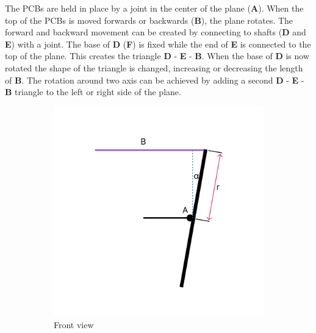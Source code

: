 \newpage\noindent
The PCBs are held in place by a joint in the center of the plane (\textbf{A}). When the top of the PCBs is moved forwards or backwards (\textbf{B}), the plane rotates. The forward and backward movement can be created by connecting to shafts (\textbf{D} and \textbf{E}) with a joint. The base of \textbf{D} (\textbf{F}) is fixed while the end of \textbf{E} is connected to the top of the plane. This creates the triangle \textbf{D} - \textbf{E} - \textbf{B}. When the base of \textbf{D} is now rotated the shape of the triangle is changed, increasing or decreasing the length of \textbf{B}.
The rotation around two axis can be achieved by adding a second \textbf{D} - \textbf{E} - \textbf{B} triangle to the left or right side of the plane.
%
\begin{figure}
  \begin{subfigure}[b]{0.49\textwidth}
    \includegraphics[width=\textwidth]{src/assets/pictures/construction/math_front.png}
    \caption{Front view}
    \label{fig:const:tilt:math_front}
  \end{subfigure}
  \hfill
  \begin{subfigure}[b]{0.49\textwidth}

\end{subfigure}
\end{figure}
